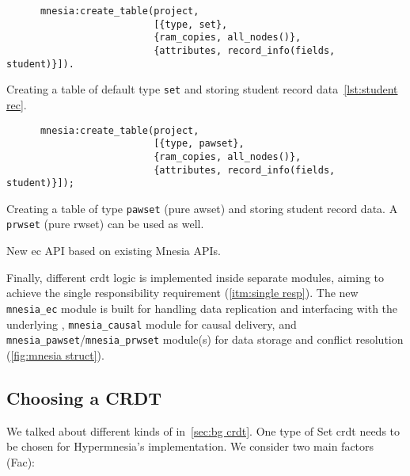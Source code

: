 \begin{listing}[htp]
  \begin{sublisting}[t]{0.46\linewidth}
    \begin{verbatim}
      mnesia:create_table(project,
                          [{type, set},
                          {ram_copies, all_nodes()},
                          {attributes, record_info(fields, student)}]).
    \end{verbatim}
    \caption{Creating a table of default type \texttt{set} and storing student 
    record data~\cref{lst:student rec}.}
    \label{lst:mnesia create table}
  \end{sublisting}
  \hfill
  \begin{sublisting}[t]{0.46\linewidth}
    \begin{verbatim}
      mnesia:create_table(project,
                          [{type, pawset},
                          {ram_copies, all_nodes()},
                          {attributes, record_info(fields, student)}]);
    \end{verbatim}
    \caption{Creating a table of type \texttt{pawset} (pure \acrlong{awset}) and 
    storing student record data. A \texttt{prwset} (pure \acrlong{rwset}) 
    can be used as well.}
    \label{lst:hypermnesia create table}
  \end{sublisting}
  \caption{New \acrfull{ec} API based on existing Mnesia APIs.} 
  \label{lst:mnesia ec create table}
\end{listing}

Finally, different \acrshort{crdt} logic is implemented inside separate modules,
aiming to achieve the single responsibility requirement (\cref{itm:single resp}).
The new \verb|mnesia_ec| module is built for handling data replication and
interfacing with the underlying , \verb|mnesia_causal| module for
causal delivery, and \verb|mnesia_pawset|/\verb|mnesia_prwset| module(s) for
data storage and conflict resolution (\cref{fig:mnesia struct}).

\subsection{Choosing a CRDT} \label{subsec:impl choose crdt}

We talked about different kinds of  in~\cref{sec:bg crdt}.
One type of Set \acrshort{crdt} needs to be chosen for Hypermnesia's implementation. 
We consider two main factors (Fac):

